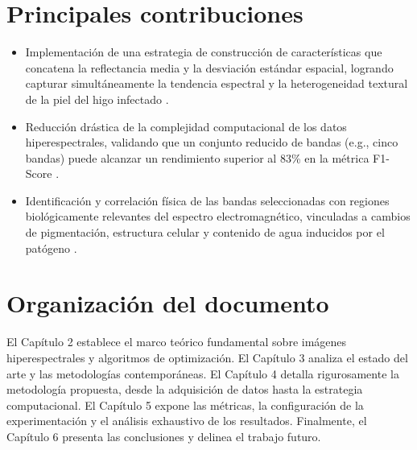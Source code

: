 \section{Principales contribuciones}
\begin{itemize}
    \item Implementación de una estrategia de construcción de características que concatena la reflectancia media y la desviación estándar espacial, logrando capturar simultáneamente la tendencia espectral y la heterogeneidad textural de la piel del higo infectado \cite{hossain_color_2019, nagasubramanian_hyperspectral_2018}.
    \item Reducción drástica de la complejidad computacional de los datos hiperespectrales, validando que un conjunto reducido de bandas (e.g., cinco bandas) puede alcanzar un rendimiento superior al 83\% en la métrica F1-Score \cite{cruz-carrasco_detection_2024}.
    \item Identificación y correlación física de las bandas seleccionadas con regiones biológicamente relevantes del espectro electromagnético, vinculadas a cambios de pigmentación, estructura celular y contenido de agua inducidos por el patógeno \cite{mahlein_plant_2016, nicolai_nondestructive_2007}.
\end{itemize}

\section{Organización del documento}
El Capítulo 2 establece el marco teórico fundamental sobre imágenes hiperespectrales y algoritmos de optimización. El Capítulo 3 analiza el estado del arte y las metodologías contemporáneas. El Capítulo 4 detalla rigurosamente la metodología propuesta, desde la adquisición de datos hasta la estrategia computacional. El Capítulo 5 expone las métricas, la configuración de la experimentación y el análisis exhaustivo de los resultados. Finalmente, el Capítulo 6 presenta las conclusiones y delinea el trabajo futuro.
